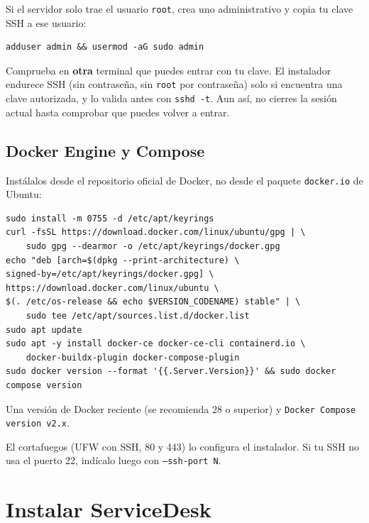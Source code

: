 \documentclass[11pt,a4paper,oneside]{report}
\newcommand{\cod}[1]{\texttt{\small #1}}
\newcommand{\donde}[1]{\par\smallskip\noindent{\small\sffamily\bfseries\color{white}\colorbox{utaRojo}{\,#1\,}}\par\nopagebreak\vspace{-2pt}}
\newcommand{\servidor}{\donde{EN EL SERVIDOR}}
\begin{document}
Si el servidor solo trae el usuario \cod{root}, crea uno administrativo y copia tu clave SSH a ese usuario:
\begin{lstlisting}
adduser admin && usermod -aG sudo admin
\end{lstlisting}

\begin{aviso}
Comprueba en \textbf{otra} terminal que puedes entrar con tu clave. El instalador endurece
SSH (sin contraseña, sin \cod{root} por contraseña) solo si encuentra una clave autorizada, y lo valida
antes con \cod{sshd -t}. Aun así, no cierres la sesión actual hasta comprobar que puedes volver a entrar.
\end{aviso}

\section{Docker Engine y Compose}
Instálalos desde el repositorio oficial de Docker, no desde el paquete \cod{docker.io} de Ubuntu:

\servidor
\begin{lstlisting}
sudo install -m 0755 -d /etc/apt/keyrings
curl -fsSL https://download.docker.com/linux/ubuntu/gpg | \
    sudo gpg --dearmor -o /etc/apt/keyrings/docker.gpg
echo "deb [arch=$(dpkg --print-architecture) \
signed-by=/etc/apt/keyrings/docker.gpg] \
https://download.docker.com/linux/ubuntu \
$(. /etc/os-release && echo $VERSION_CODENAME) stable" | \
    sudo tee /etc/apt/sources.list.d/docker.list
sudo apt update
sudo apt -y install docker-ce docker-ce-cli containerd.io \
    docker-buildx-plugin docker-compose-plugin
sudo docker version --format '{{.Server.Version}}' && sudo docker compose version
\end{lstlisting}

\begin{esperado}
Una versión de Docker reciente (se recomienda 28 o superior) y \cod{Docker Compose version v2.x}.
\end{esperado}

El cortafuegos (UFW con SSH, 80 y 443) lo configura el instalador. Si tu SSH no usa el puerto 22,
indícalo luego con \cod{--ssh-port N}.

\chapter{Instalar ServiceDesk}\label{cap:instalar}
\end{document}

